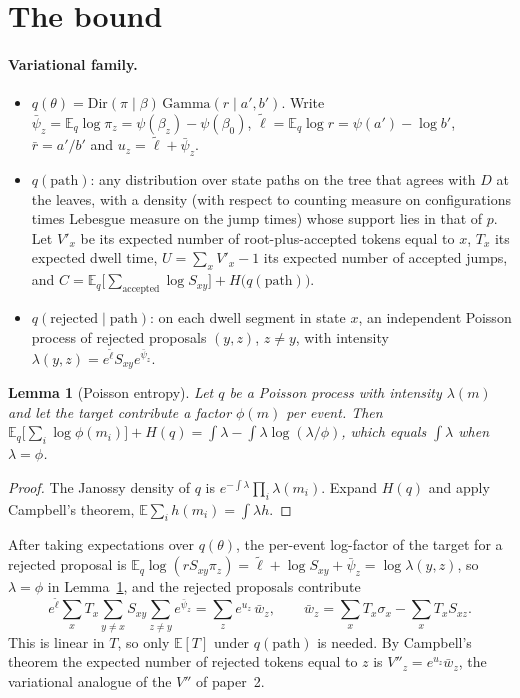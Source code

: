 \documentclass[11pt]{article}
\newtheorem{lemma}{Lemma}
\newcommand{\E}{\mathbb E}
\newcommand{\Dir}{\mathrm{Dir}}
\newcommand{\Gam}{\mathrm{Gamma}}
\begin{document}
\section{The bound}

\paragraph{Variational family.}
\begin{itemize}
\item $q(\theta)=\Dir(\pi\mid\beta)\,\Gam(r\mid a',b')$. Write
  $\bar\psi_z=\E_q\log\pi_z=\psi(\beta_z)-\psi(\beta_0)$,
  $\tilde\ell=\E_q\log r=\psi(a')-\log b'$, $\bar r=a'/b'$ and
  $u_z=\tilde\ell+\bar\psi_z$.
\item $q(\text{path})$: any distribution over state paths on the tree that
  agrees with $D$ at the leaves, with a density (with respect to counting
  measure on configurations times Lebesgue measure on the jump times) whose
  support lies in that of $p$. Let $V'_x$ be its expected number of root-plus-accepted tokens equal to
  $x$, $T_x$ its expected dwell time, $U=\sum_xV'_x-1$ its expected number of
  accepted jumps, and
  $C=\E_q\big[\sum_{\text{accepted}}\log S_{xy}\big]+H\big(q(\text{path})\big)$.
\item $q(\text{rejected}\mid\text{path})$: on each dwell segment in state $x$,
  an independent Poisson process of rejected proposals $(y,z)$, $z\ne y$, with
  intensity $\lambda(y,z)=e^{\tilde\ell}S_{xy}e^{\bar\psi_z}$.
\end{itemize}

\begin{lemma}[Poisson entropy]\label{lem:poisson}
Let $q$ be a Poisson process with intensity $\lambda(m)$ and let the target
contribute a factor $\phi(m)$ per event. Then
$\E_q\big[\sum_i\log\phi(m_i)\big]+H(q)=\int\lambda-\int\lambda\log(\lambda/\phi)$,
which equals $\int\lambda$ when $\lambda=\phi$.
\end{lemma}
\begin{proof}
The Janossy density of $q$ is $e^{-\int\lambda}\prod_i\lambda(m_i)$. Expand
$H(q)$ and apply Campbell's theorem, $\E\sum_ih(m_i)=\int\lambda h$.
\end{proof}

After taking expectations over $q(\theta)$, the per-event log-factor of the
target for a rejected proposal is
$\E_q\log(rS_{xy}\pi_z)=\tilde\ell+\log S_{xy}+\bar\psi_z=\log\lambda(y,z)$,
so $\lambda=\phi$ in Lemma~\ref{lem:poisson}, and the rejected proposals
contribute
\begin{equation}\label{eq:rej}
e^{\tilde\ell}\sum_xT_x\sum_{y\ne x}S_{xy}\sum_{z\ne y}e^{\bar\psi_z}
=\sum_z e^{u_z}\,\bar w_z,
\qquad \bar w_z=\sum_xT_x\sigma_x-\sum_xT_xS_{xz}.
\end{equation}
This is linear in $T$, so only $\E[T]$ under $q(\text{path})$ is needed. By
Campbell's theorem the expected number of rejected tokens equal to $z$ is
$V''_z=e^{u_z}\bar w_z$, the variational analogue of the $V''$ of paper~2.
\end{document}
